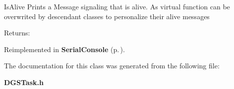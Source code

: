 Is\-Alive Prints a Message signaling that is alive. As virtual function can be overwrited by descendant classes to personalize their alive messages \begin{Desc}
\item[Returns:]\end{Desc}


Reimplemented in {\bf Serial\-Console} {\rm (p.\,\pageref{classSerialConsole_a4})}.

The documentation for this class was generated from the following file:\begin{CompactItemize}
\item 
{\bf DGSTask.h}\end{CompactItemize}
